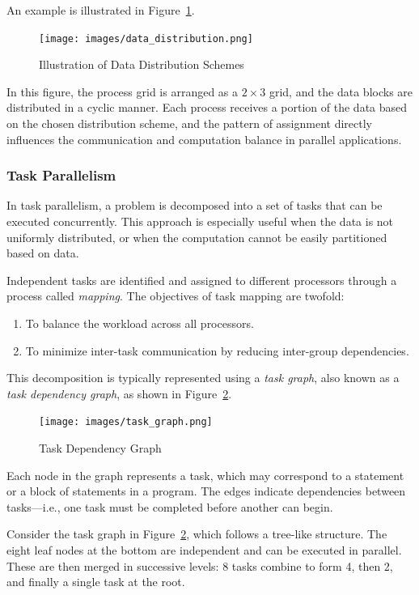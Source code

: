 \documentclass[12pt]{book}
\begin{document}
An example is illustrated in Figure~\ref{fig:data_distribution}.

\begin{figure}[H]
    \centering
    \texttt{[image: images/data\_distribution.png]}
    \caption{Illustration of Data Distribution Schemes}
    \label{fig:data_distribution}
\end{figure}

In this figure, the process grid is arranged as a $2 \times 3$ grid, and the data blocks are distributed in a cyclic manner. Each process receives a portion of the data based on the chosen distribution scheme, and the pattern of assignment directly influences the communication and computation balance in parallel applications.

\subsubsection{Task Parallelism}

In task parallelism, a problem is decomposed into a set of tasks that can be executed concurrently. This approach is especially useful when the data is not uniformly distributed, or when the computation cannot be easily partitioned based on data.

Independent tasks are identified and assigned to different processors through a process called \textit{mapping}. The objectives of task mapping are twofold: 
\begin{enumerate}
    \item To balance the workload across all processors.
    \item To minimize inter-task communication by reducing inter-group dependencies.
\end{enumerate}

This decomposition is typically represented using a \textit{task graph}, also known as a \textit{task dependency graph}, as shown in Figure~\ref{fig:task_graph}.

\begin{figure}[H]
    \centering
    \texttt{[image: images/task\_graph.png]}
    \caption{Task Dependency Graph}
    \label{fig:task_graph}
\end{figure}

Each node in the graph represents a task, which may correspond to a statement or a block of statements in a program. The edges indicate dependencies between tasks—i.e., one task must be completed before another can begin.

Consider the task graph in Figure~\ref{fig:task_graph}, which follows a tree-like structure. The eight leaf nodes at the bottom are independent and can be executed in parallel. These are then merged in successive levels: 8 tasks combine to form 4, then 2, and finally a single task at the root.
\end{document}
